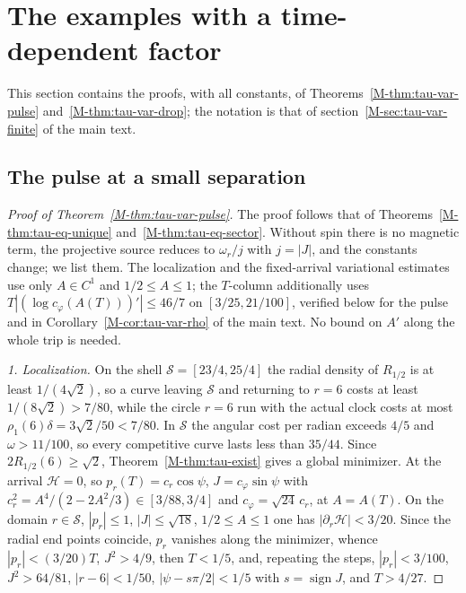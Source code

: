 \documentclass[aip,jmp,amsmath,amssymb,reprint]{revtex4-2}
\theoremstyle{plain}
\theoremstyle{definition}
\begin{document}
\section{The examples with a time-dependent factor}
\label{sec:supp-ts-examples}
This section contains the proofs, with all constants, of Theorems~\ref{M-thm:tau-var-pulse}
and~\ref{M-thm:tau-var-drop}; the notation is that of section~\ref{M-sec:tau-var-finite} of the main text.

\subsection{The pulse at a small separation}
\begin{proof}[Proof of Theorem~\ref{M-thm:tau-var-pulse}]
The proof follows that of Theorems~\ref{M-thm:tau-eq-unique} and~\ref{M-thm:tau-eq-sector}. Without spin
there is no magnetic term, the projective source reduces to $\omega_r/j$ with $j=|J|$, and the constants
change; we list them. The localization and the fixed-arrival variational estimates use only
$A\in C^1$ and $1/2\le A\le1$; the $T$-column additionally uses
$T|(\log c_\varphi(A(T)))'|\le46/7$ on $[3/25,21/100]$, verified below for the pulse and in Corollary~\ref{M-cor:tau-var-rho} of the main text. No bound on $A'$ along the whole trip is needed.

\emph{1. Localization.} On the shell $\mathcal S=[23/4,25/4]$ the radial density of $R_{1/2}$ is at least
$1/(4\sqrt2)$, so a curve leaving $\mathcal S$ and returning to $r=6$ costs at least $1/(8\sqrt2)>7/80$, while
the circle $r=6$ run with the actual clock costs at most $\rho_1(6)\delta=3\sqrt2/50<7/80$. In $\mathcal S$
the angular cost per radian exceeds $4/5$ and $\omega>11/100$, so every competitive curve lasts less
than $35/44$. Since $2R_{1/2}(6)\ge\sqrt2$, Theorem~\ref{M-thm:tau-exist} gives a global minimizer. At the
arrival $\mathcal H=0$, so $p_r(T)=c_r\cos\psi$, $J=c_\varphi\sin\psi$ with
$c_r^2=A^4/(2-2A^2/3)\in[3/88,3/4]$ and $c_\varphi=\sqrt{24}\,c_r$, at $A=A(T)$. On the domain
$r\in\mathcal S$, $|p_r|\le1$, $|J|\le\sqrt{18}$, $1/2\le A\le1$ one has $|\partial_r\mathcal H|<3/20$. Since the
radial end points coincide, $p_r$ vanishes along the minimizer, whence $|p_r|<(3/20)T$,
$J^2>4/9$, then $T<1/5$, and, repeating the steps, $|p_r|<3/100$, $J^2>64/81$, $|r-6|<1/50$,
$|\psi-s\pi/2|<1/5$ with $s=\operatorname{sign}J$, and $T>4/27$.


\end{proof}
\end{document}
